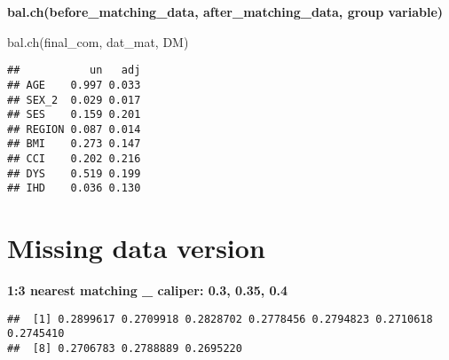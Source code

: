 \documentclass[
]{book}
\newenvironment{Shaded}{\begin{snugshade}}{\end{snugshade}}
\newcommand{\AttributeTok}[1]{\textcolor[rgb]{0.77,0.63,0.00}{#1}}
\newcommand{\ControlFlowTok}[1]{\textcolor[rgb]{0.13,0.29,0.53}{\textbf{#1}}}
\newcommand{\DecValTok}[1]{\textcolor[rgb]{0.00,0.00,0.81}{#1}}
\newcommand{\DocumentationTok}[1]{\textcolor[rgb]{0.56,0.35,0.01}{\textbf{\textit{#1}}}}
\newcommand{\FloatTok}[1]{\textcolor[rgb]{0.00,0.00,0.81}{#1}}
\newcommand{\FunctionTok}[1]{\textcolor[rgb]{0.00,0.00,0.00}{#1}}
\newcommand{\NormalTok}[1]{#1}
\newcommand{\OtherTok}[1]{\textcolor[rgb]{0.56,0.35,0.01}{#1}}
\newcommand{\SpecialCharTok}[1]{\textcolor[rgb]{0.00,0.00,0.00}{#1}}
\newcommand{\StringTok}[1]{\textcolor[rgb]{0.31,0.60,0.02}{#1}}
\theoremstyle{definition}
\theoremstyle{definition}
\theoremstyle{definition}
\theoremstyle{definition}
\theoremstyle{remark}
\begin{document}
\textbf{bal.ch(before\_matching\_data, after\_matching\_data, group variable)}

\begin{Shaded}
\begin{Highlighting}[]
\FunctionTok{bal.ch}\NormalTok{(final\_com, dat\_mat, DM)}
\end{Highlighting}
\end{Shaded}

\begin{verbatim}
##           un   adj
## AGE    0.997 0.033
## SEX_2  0.029 0.017
## SES    0.159 0.201
## REGION 0.087 0.014
## BMI    0.273 0.147
## CCI    0.202 0.216
## DYS    0.519 0.199
## IHD    0.036 0.130
\end{verbatim}

\hypertarget{missing-data-version}{%
\section{Missing data version}\label{missing-data-version}}

\textbf{1:3 nearest matching \_ caliper: 0.3, 0.35, 0.4}

\begin{Shaded}
\end{Shaded}

\begin{verbatim}
##  [1] 0.2899617 0.2709918 0.2828702 0.2778456 0.2794823 0.2710618 0.2745410
##  [8] 0.2706783 0.2788889 0.2695220
\end{verbatim}
\end{document}
